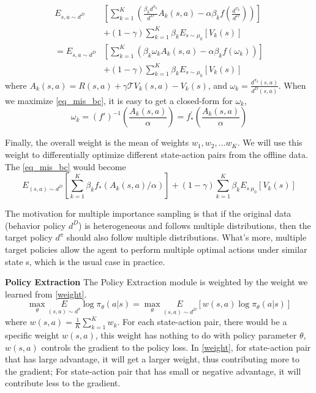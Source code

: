\documentclass[nohyperref]{article}
\theoremstyle{plain}
\theoremstyle{definition}
\theoremstyle{remark}
\begin{document}
\begin{equation}
\begin{aligned}
E_{s,a \sim d^D} &\left[ \sum_{k=1}^K{\left( \frac{\beta _kd^{\pi _k}}{d^D}A_k( s,a ) -\alpha \beta _kf( \frac{d^{\pi _k}}{d^D} ) \right)} \right] \\
&+( 1-\gamma) \sum_{k=1}^K{\beta _kE_{s \sim \mu _0}[ V_k( s)]}  \\
=E_{s,a \sim d^D} &\left[ \sum_{k=1}^K{\left( \beta _k\omega _kA_k( s,a) -\alpha \beta _kf( \omega _k ) \right)} \right] \\
&+( 1-\gamma) \sum_{k=1}^K{\beta _kE_{s \sim \mu _0}[ V_k( s)]}   \label{eq_mis_bc}
\end{aligned}
\end{equation}
where $A_k(s,a)=R(s,a)+\gamma \mathcal{T}V_k( s,a ) -V_k(s)$, and $\omega _k = \frac{d^{\pi _k}(s,a)}{d^D(s,a)}$.
When we maximize \eqref{eq_mis_bc}, it is easy to get a closed-form for $\omega _k$, 
\begin{equation}
\label{weight}
\omega _k = (f')^{-1}\left(\frac{A_k( s,a)}{\alpha} \right) =f^{\prime}_{\ast}\left( \frac{A_k(s,a)}{\alpha} \right) 
\end{equation}

Finally, the overall weight is the mean of weights $w_1, w_2, ...w_K$.
We will use this weight to differentially optimize different state-action pairs from the offline data. The \eqref{eq_mis_bc} would become 
\begin{equation}
\label{bc_w_loss}
E_{(s,a) \sim d^D}\left[ \sum_{k=1}^K{\beta _kf_*\left( A_k(s,a) /\alpha \right)} \right] +(1-\gamma) \sum_{k=1}^K{\beta _kE_{s~\mu _0}\left[ V_k(s) \right]}
\end{equation}

The motivation for multiple importance sampling is that if the original data (behavior policy $d^D$) is heterogeneous and follows multiple distributions, then the target policy $d^{\pi}$ should also follow multiple distributions. What’s more, multiple target policies allow the agent to perform multiple optimal actions under similar state s, which is the usual case in practice.

\textbf{Policy Extraction}
The Policy Extraction module is weighted by the weight we learned from \eqref{weight}. 
\begin{equation}
\label{policy_extract}
\underset{\theta}{\max}\underset{( s,a ) \sim d^{\pi}}{E}\log \pi _{\theta}(a|s) =\underset{\theta}{\max}\underset{(s,a) \sim d^D}{E}[ w(s,a) \log \pi _{\theta}(a|s)] 
\end{equation}
where $w(s,a) =\frac{1}{K}\sum_{k=1}^K{w_k}$. For each state-action pair, there would be a specific weight $w(s,a)$, this weight has nothing to do with policy parameter $\theta$, $w(s,a)$ controls the gradient to the policy loss. In \eqref{weight}, for state-action pair that has large advantage, it will get a larger weight, thus contributing more to the gradient; For state-action pair that has small or negative advantage, it will contribute less to the gradient. 
\end{document}
